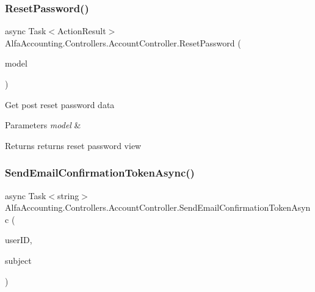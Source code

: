 \subsubsection{\texorpdfstring{Reset\+Password()}{ResetPassword()}\hspace{0.1cm}{\footnotesize\ttfamily [2/2]}}
{\footnotesize\ttfamily async Task$<$Action\+Result$>$ Alfa\+Accounting.\+Controllers.\+Account\+Controller.\+Reset\+Password (\begin{DoxyParamCaption}\item[{Reset\+Password\+View\+Model}]{model }\end{DoxyParamCaption})}



Get post reset password data 


\begin{DoxyParams}{Parameters}
{\em model} & \\
\hline
\end{DoxyParams}
\begin{DoxyReturn}{Returns}
returns reset password view
\end{DoxyReturn}
\mbox{\label{class_alfa_accounting_1_1_controllers_1_1_account_controller_a1fa3a682bb8d5ec0d2338412decc261a}} 
\subsubsection{\texorpdfstring{Send\+Email\+Confirmation\+Token\+Async()}{SendEmailConfirmationTokenAsync()}}
{\footnotesize\ttfamily async Task$<$string$>$ Alfa\+Accounting.\+Controllers.\+Account\+Controller.\+Send\+Email\+Confirmation\+Token\+Async (\begin{DoxyParamCaption}\item[{string}]{user\+ID,  }\item[{string}]{subject }\end{DoxyParamCaption})\hspace{0.3cm}{\ttfamily [private]}}



